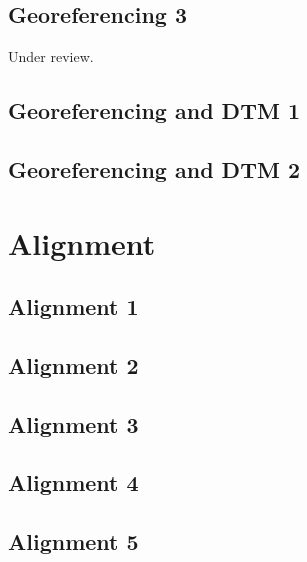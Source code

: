 \documentclass{scrartcl}
\begin{document}
\subsection{Georeferencing 3}
\label{sec:georeferencing_3}
Under review.%
\clearpage

\subsection{Georeferencing and DTM 1}
\label{sec:georef_tin_1}
\clearpage

\subsection{Georeferencing and DTM 2}
\label{sec:georef_tin_2}
\clearpage

\section{Alignment}

\subsection{Alignment 1}
\label{sec:align_1}
\clearpage

\subsection{Alignment 2}
\label{sec:align_2}
\clearpage

\subsection{Alignment 3}
\label{sec:align_3}
\clearpage

\subsection{Alignment 4}
\label{sec:align_4}
\clearpage

\subsection{Alignment 5}
\label{sec:align_5}
\clearpage
\end{document}
